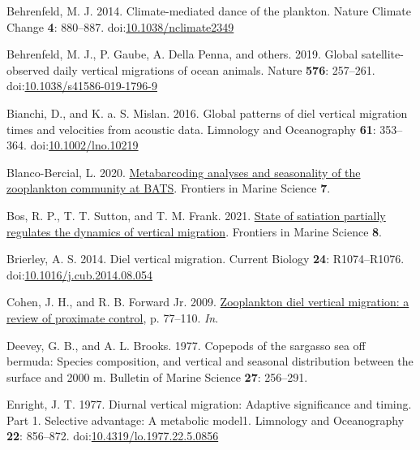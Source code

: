 \documentclass[
]{article}
\newlength{\cslhangindent}
\newlength{\cslentryspacingunit} %
\newenvironment{CSLReferences}[2] %
 {%
  \setlength{\parindent}{0pt}
  \ifodd #1
  \let\oldpar\par
  \def\par{\hangindent=\cslhangindent\oldpar}
  \fi
  \setlength{\parskip}{#2\cslentryspacingunit}
 }%
 {}
\begin{document}
\begin{CSLReferences}{1}{0}
\leavevmode{}%
Behrenfeld, M. J. 2014. Climate-mediated dance of the plankton. Nature
Climate Change \textbf{4}: 880--887.
doi:\href{https://doi.org/10.1038/nclimate2349}{10.1038/nclimate2349}

\leavevmode{}%
Behrenfeld, M. J., P. Gaube, A. Della Penna, and others. 2019. Global
satellite-observed daily vertical migrations of ocean animals. Nature
\textbf{576}: 257--261.
doi:\href{https://doi.org/10.1038/s41586-019-1796-9}{10.1038/s41586-019-1796-9}

\leavevmode{}%
Bianchi, D., and K. a. S. Mislan. 2016. Global patterns of diel vertical
migration times and velocities from acoustic data. Limnology and
Oceanography \textbf{61}: 353--364.
doi:\href{https://doi.org/10.1002/lno.10219}{10.1002/lno.10219}

\leavevmode{}%
Blanco-Bercial, L. 2020.
\href{https://www.frontiersin.org/articles/10.3389/fmars.2020.00173}{Metabarcoding
analyses and seasonality of the zooplankton community at BATS}.
Frontiers in Marine Science \textbf{7}.

\leavevmode{}%
Bos, R. P., T. T. Sutton, and T. M. Frank. 2021.
\href{https://www.frontiersin.org/articles/10.3389/fmars.2021.607228}{State
of satiation partially regulates the dynamics of vertical migration}.
Frontiers in Marine Science \textbf{8}.

\leavevmode{}%
Brierley, A. S. 2014. Diel vertical migration. Current Biology
\textbf{24}: R1074--R1076.
doi:\href{https://doi.org/10.1016/j.cub.2014.08.054}{10.1016/j.cub.2014.08.054}

\leavevmode{}%
Cohen, J. H., and R. B. Forward Jr. 2009.
\href{https://www.vliz.be/en/imis}{Zooplankton diel vertical migration:
a review of proximate control}, p. 77--110. \emph{In}.

\leavevmode{}%
Deevey, G. B., and A. L. Brooks. 1977. Copepods of the sargasso sea off
bermuda: Species composition, and vertical and seasonal distribution
between the surface and 2000 m. Bulletin of Marine Science \textbf{27}:
256--291.

\leavevmode{}%
Enright, J. T. 1977. Diurnal vertical migration: Adaptive significance
and timing. Part 1. Selective advantage: A metabolic model1. Limnology
and Oceanography \textbf{22}: 856--872.
doi:\href{https://doi.org/10.4319/lo.1977.22.5.0856}{10.4319/lo.1977.22.5.0856}


\end{CSLReferences}
\end{document}
